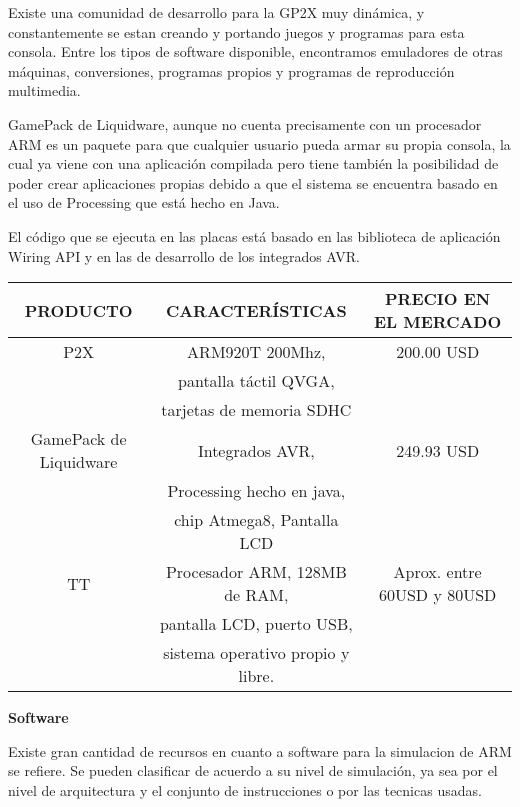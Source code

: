 Existe una comunidad de desarrollo para la GP2X muy dinámica, y constantemente se estan creando y portando juegos y programas para esta consola. Entre los tipos de software disponible, encontramos emuladores de otras máquinas, conversiones, programas propios y programas de reproducción multimedia.\medskip

GamePack de Liquidware, aunque no cuenta precisamente con un procesador ARM es un paquete para que cualquier usuario pueda armar su propia consola, la cual ya viene con una aplicación compilada pero tiene también la posibilidad de poder crear   aplicaciones propias debido a que el sistema se encuentra basado en el uso de Processing que está hecho en Java.\medskip

El código que se ejecuta en las placas está basado en las biblioteca de aplicación Wiring API y en las de desarrollo de los integrados AVR.\medskip

\begin{center}
\begin{tabular}{|c|c|c|}
\hline
\hline
\scriptsize PRODUCTO & \scriptsize CARACTERÍSTICAS & \scriptsize PRECIO EN EL MERCADO \\
\hline
\scriptsize P2X & \scriptsize ARM920T 200Mhz,& \scriptsize 200.00 USD \\
& \scriptsize pantalla táctil QVGA,& \\
& \scriptsize tarjetas de memoria SDHC  & \\
\hline
\scriptsize GamePack de Liquidware & \scriptsize Integrados AVR,& \scriptsize 249.93 USD \\
& \scriptsize Processing hecho en java,& \\
& \scriptsize chip Atmega8, \scriptsize Pantalla LCD & \\
\hline
\scriptsize TT & \scriptsize Procesador ARM, 128MB de RAM,& \scriptsize Aprox. entre 60USD y 80USD  \\
& \scriptsize pantalla LCD, puerto USB,& \\
& \scriptsize sistema operativo propio y libre. & \\
\hline
\end{tabular}
\end{center}\medskip

{\bf Software}\medskip

Existe gran cantidad de recursos en cuanto a software para la simulacion de ARM se refiere. Se pueden clasificar de acuerdo a su nivel de simulación, ya sea por el nivel de arquitectura y el conjunto de instrucciones o por las tecnicas usadas.\medskip

